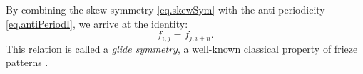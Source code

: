 \documentclass[11pt]{amsart}
\theoremstyle{plain}
\theoremstyle{definition}
\theoremstyle{remark}
\begin{document}
By combining the skew symmetry \eqref{eq.skewSym} with the anti-periodicity
\eqref{eq.antiPeriodI}, we arrive at the identity:
\begin{equation} \label{eq.glideSym.}
    f_{i,j} = f_{j, i+n}.
\end{equation}
This relation is called a \textit{glide symmetry}, a well-known classical
property of frieze patterns \cite{Genoud2015, Nisiyama2022}.
\end{document}
